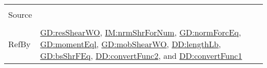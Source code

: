 \documentclass[12pt]{article}
\begin{document}
\begin{minipage}{\textwidth}
\begin{tabular}{>{\raggedright}p{}>{\raggedright\arraybackslash}p{}}
\\ \midrule \\
Source & \cite{fredlund1977}
         
\\ \midrule \\
RefBy & \hyperref[GD:resShearWO]{GD:resShearWO}, \hyperref[IM:nrmShrForNum]{IM:nrmShrForNum}, \hyperref[GD:normForcEq]{GD:normForcEq}, \hyperref[GD:momentEql]{GD:momentEql}, \hyperref[GD:mobShearWO]{GD:mobShearWO}, \hyperref[DD:lengthLb]{DD:lengthLb}, \hyperref[GD:bsShrFEq]{GD:bsShrFEq}, \hyperref[DD:convertFunc2]{DD:convertFunc2}, and \hyperref[DD:convertFunc1]{DD:convertFunc1}
        
\\ \bottomrule
\end{tabular}
\end{minipage}
\end{document}
